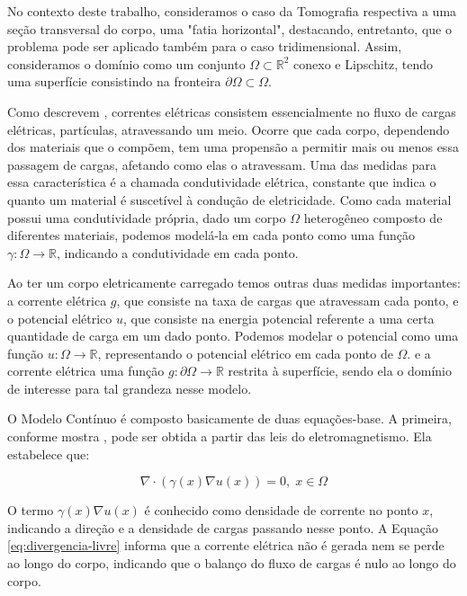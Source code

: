No contexto deste trabalho, consideramos o caso da Tomografia respectiva a uma seção transversal do corpo, uma "fatia horizontal", destacando, entretanto, que o problema pode ser aplicado também para o caso tridimensional. Assim, consideramos o domínio como um conjunto $\Omega \subset \mathbb R^2$ conexo e Lipschitz, tendo uma superfície consistindo na fronteira $\partial \Omega \subset \Omega$.

Como descrevem \cite{halliday}, correntes elétricas consistem essencialmente no fluxo de cargas elétricas, partículas, atravessando um meio. Ocorre que cada corpo, dependendo dos materiais que o compõem, tem uma propensão a permitir mais ou menos essa passagem de cargas, afetando como elas o atravessam. Uma das medidas para essa característica é a chamada condutividade elétrica, constante que indica o quanto um material é suscetível à condução de eletricidade. Como cada material possui uma condutividade própria, dado um corpo $\Omega$ heterogêneo composto de diferentes materiais, podemos modelá-la em cada ponto como uma função $\gamma : \Omega \to \mathbb R$, indicando a condutividade em cada ponto.

Ao ter um corpo eletricamente carregado temos outras duas medidas importantes: a corrente elétrica $g$, que consiste na taxa de cargas que atravessam cada ponto, e o potencial elétrico $u$, que consiste na energia potencial referente a uma certa quantidade de carga em um dado ponto. Podemos modelar o potencial como uma função $u: \Omega \to \mathbb R$, representando o potencial elétrico em cada ponto de $\Omega$. e a corrente elétrica uma função $g: \partial \Omega \to \mathbb R$ restrita à superfície, sendo ela o domínio de interesse para tal grandeza nesse modelo.

O Modelo Contínuo é composto basicamente de duas equações-base. A primeira, conforme mostra , pode ser obtida a partir das leis do eletromagnetismo. Ela estabelece que:

\begin{equation}\label{eq:divergencia-livre}
    \nabla \cdot (\gamma(x) \nabla u(x)) = 0, \; x\in \Omega
\end{equation}

O termo $\gamma(x) \nabla u(x)$ é conhecido como densidade de corrente no ponto $x$, indicando a direção e a densidade de cargas passando nesse ponto. A Equação \ref{eq:divergencia-livre} informa que a corrente elétrica não é gerada nem se perde ao longo do corpo, indicando que o balanço do fluxo de cargas é nulo ao longo do corpo. 

